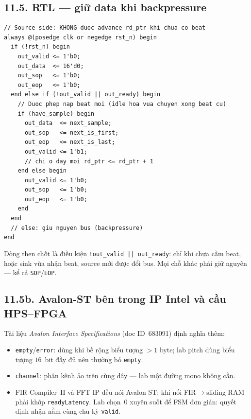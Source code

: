 \subsection*{11.5. RTL --- giữ data khi backpressure}

\begin{verbatim}
// Source side: KHONG duoc advance rd_ptr khi chua co beat
always @(posedge clk or negedge rst_n) begin
  if (!rst_n) begin
    out_valid <= 1'b0;
    out_data  <= 16'd0;
    out_sop   <= 1'b0;
    out_eop   <= 1'b0;
  end else if (!out_valid || out_ready) begin
    // Duoc phep nap beat moi (idle hoa vua chuyen xong beat cu)
    if (have_sample) begin
      out_data  <= next_sample;
      out_sop   <= next_is_first;
      out_eop   <= next_is_last;
      out_valid <= 1'b1;
      // chi o day moi rd_ptr <= rd_ptr + 1
    end else begin
      out_valid <= 1'b0;
      out_sop   <= 1'b0;
      out_eop   <= 1'b0;
    end
  end
  // else: giu nguyen bus (backpressure)
end
\end{verbatim}

Dòng then chốt là điều kiện \texttt{!out\_valid || out\_ready}: chỉ khi chưa cầm beat, hoặc sink vừa nhận beat, source mới được đổi bus. Mọi chỗ khác phải giữ nguyên --- kể cả \texttt{SOP}/\texttt{EOP}.

\subsection*{11.5b. Avalon-ST bên trong IP Intel và cầu HPS--FPGA}

Tài liệu \emph{Avalon Interface Specifications} (doc ID~683091) định nghĩa thêm:
\begin{itemize}[leftmargin=1.4em]
  \item \texttt{empty}/\texttt{error}: dùng khi bề rộng biểu tượng $>1$ byte; lab pitch dùng biểu tượng $16$~bit đầy đủ nên thường bỏ \texttt{empty}.
  \item \texttt{channel}: phân kênh ảo trên cùng dây --- lab một đường mono không cần.
  \item FIR Compiler~II và FFT IP đều nói Avalon-ST; khi nối FIR$\to$sliding RAM phải khớp \texttt{readyLatency}. Lab chọn~$0$ xuyên suốt để FSM đơn giản: quyết định nhận nằm cùng chu kỳ \texttt{valid}.
\end{itemize}

